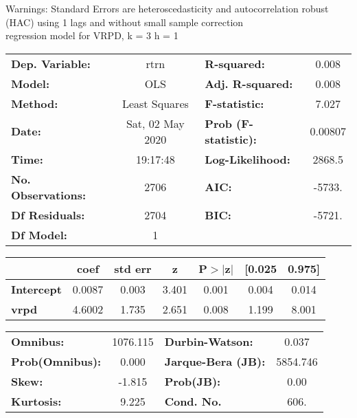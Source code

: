 Warnings: \newline
 [1] Standard Errors are heteroscedasticity and autocorrelation robust (HAC) using 1 lags and without small sample correction\\ 

regression model for VRPD, k = 3 h = 1\begin{center}
\begin{tabular}{lclc}
\toprule
\textbf{Dep. Variable:}    &       rtrn       & \textbf{  R-squared:         } &     0.008   \\
\textbf{Model:}            &       OLS        & \textbf{  Adj. R-squared:    } &     0.008   \\
\textbf{Method:}           &  Least Squares   & \textbf{  F-statistic:       } &     7.027   \\
\textbf{Date:}             & Sat, 02 May 2020 & \textbf{  Prob (F-statistic):} &  0.00807    \\
\textbf{Time:}             &     19:17:48     & \textbf{  Log-Likelihood:    } &    2868.5   \\
\textbf{No. Observations:} &        2706      & \textbf{  AIC:               } &    -5733.   \\
\textbf{Df Residuals:}     &        2704      & \textbf{  BIC:               } &    -5721.   \\
\textbf{Df Model:}         &           1      & \textbf{                     } &             \\
\bottomrule
\end{tabular}
\begin{tabular}{lcccccc}
                   & \textbf{coef} & \textbf{std err} & \textbf{z} & \textbf{P$> |$z$|$} & \textbf{[0.025} & \textbf{0.975]}  \\
\midrule
\textbf{Intercept} &       0.0087  &        0.003     &     3.401  &         0.001        &        0.004    &        0.014     \\
\textbf{vrpd}      &       4.6002  &        1.735     &     2.651  &         0.008        &        1.199    &        8.001     \\
\bottomrule
\end{tabular}
\begin{tabular}{lclc}
\textbf{Omnibus:}       & 1076.115 & \textbf{  Durbin-Watson:     } &    0.037  \\
\textbf{Prob(Omnibus):} &   0.000  & \textbf{  Jarque-Bera (JB):  } & 5854.746  \\
\textbf{Skew:}          &  -1.815  & \textbf{  Prob(JB):          } &     0.00  \\
\textbf{Kurtosis:}      &   9.225  & \textbf{  Cond. No.          } &     606.  \\
\bottomrule
\end{tabular}
\end{center}

